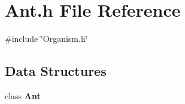 \section{Ant.\+h File Reference}
\label{Ant_8h}
{\ttfamily \#include \char`\"{}Organism.\+h\char`\"{}}\newline
\subsection*{Data Structures}
\begin{DoxyCompactItemize}
\item 
class \textbf{ Ant}
\end{DoxyCompactItemize}
